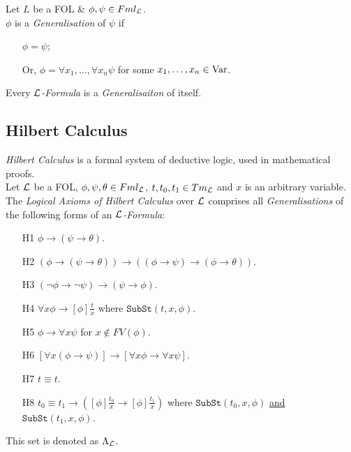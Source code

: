 \documentclass[11pt,a4paper]{article}
\begin{document}

Let $L$ be a FOL \& $\phi,\psi\in Fml_{\mathcal{L}}$.\\
$\phi$ is a \textit{Generalisation} of $\psi$ if
\begin{itemize}
	\item[] $\phi=\psi$;
	\item[Or,] $\phi=\forall x_1,\dots,\forall x_n\psi$ for some $x_1,\dots,x_n\in\mathrm{Var}$.
\end{itemize}
\nb Every \textit{$\mathcal{L}$-Formula} is a \textit{Generalisaiton} of itself.\\

\subsection{Hilbert Calculus}

\textit{Hilbert Calculus} is a formal system of deductive logic, used in mathematical proofs.\\

Let $\mathcal{L}$ be a FOL, $\phi,\psi,\theta\in Fml_{\mathcal{L}}$, $t,t_0,t_1\in Tm_{\mathcal{L}}$ and $x$ is an arbitrary variable.\\
The \textit{Logical Axioms of Hilbert Calculus} over $\mathcal{L}$ comprises all \textit{Generalisations} of the following forms of an \textit{$\mathcal{L}$-Formula}:
\begin{itemize}
	\item[H1] $\phi\to(\psi\to\theta)$.
	\item[H2] $(\phi\to(\psi\to\theta))\to((\phi\to\psi)\to(\phi\to\theta))$.
	\item[H3] $(\neg\phi\to\neg\psi)\to(\psi\to\phi)$.
	\item[H4] $\forall x\phi\to[\phi]\frac{t}x$ where $\mathtt{SubSt}(t,x,\phi)$.
	\item[H5] $\phi\to\forall x\psi$ for $x\not\in FV(\phi)$.
	\item[H6] $[\forall x(\phi\to\psi)]\to[\forall x\phi\to\forall x\psi]$.
	\item[H7] $t\equiv t$.
	\item[H8] $t_0\equiv t_1\to\left([\phi]\frac{t_0}x\to[\phi]\frac{t_1}x\right)$ where $\mathtt{SubSt}(t_0,x,\phi)$ \underline{and} $\mathtt{SubSt}(t_1,x,\phi)$.
\end{itemize}
\nb This set is denoted as $\Lambda_{\mathcal{L}}$.\\
\end{document}
